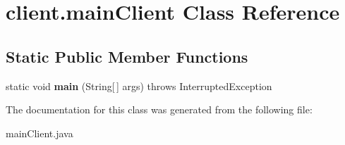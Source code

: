\hypertarget{classclient_1_1mainClient}{}\section{client.\+main\+Client Class Reference}
\label{classclient_1_1mainClient}
\subsection*{Static Public Member Functions}
\begin{DoxyCompactItemize}
\item 
\mbox{\label{classclient_1_1mainClient_a0b28fb87463204b64524e5261b283d23}} 
static void {\bfseries main} (String\mbox{[}$\,$\mbox{]} args)  throws Interrupted\+Exception 
\end{DoxyCompactItemize}


The documentation for this class was generated from the following file\+:\begin{DoxyCompactItemize}
\item 
main\+Client.\+java\end{DoxyCompactItemize}
